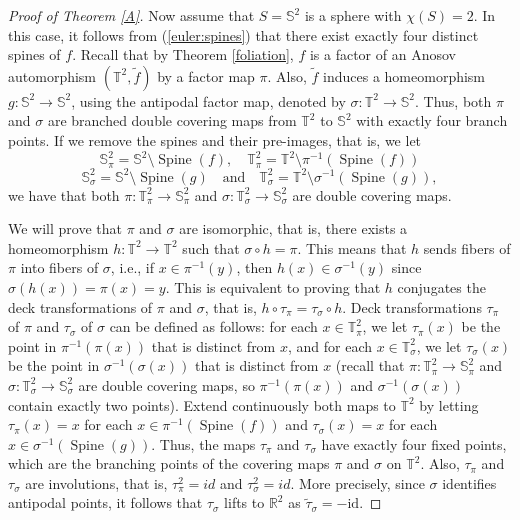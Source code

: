 \documentclass{amsart}
\theoremstyle{plain}
\theoremstyle{definition}
\newcommand{\spine}{\operatorname{Spine}}
\newcommand{\T}{\mathbb{T}}
\newcommand{\R}{\mathbb{R}}
\begin{document}
\begin{proof}[Proof of Theorem \ref{A}]
Now assume that $S=\mathbb{S}^2$ is a sphere with $\chi(S)=2$. In this case, it follows from (\ref{euler:spines}) that there exist exactly four distinct spines of $f$. Recall that by Theorem \ref{foliation}, $f$ is a factor of an Anosov automorphism $(\T^2,\tilde f)$ by a factor map $\pi$. Also, $\tilde f$ induces a homeomorphism $g\colon \mathbb{S}^2\to\mathbb{S}^2$, using the antipodal factor map, denoted by $\sigma\colon\mathbb{T}^2\to\mathbb{S}^2$. Thus, both $\pi$ and $\sigma$ are branched double covering maps from $\mathbb{T}^2$ to $\mathbb{S}^2$ with exactly four branch points. 
If we remove the spines and their pre-images, that is, we let $$\mathbb{S}^2_{\pi}=\mathbb{S}^2\setminus\spine(f), \,\,\,\,\,\, \mathbb{T}^{2}_{\pi}=\mathbb{T}^2\setminus\pi^{-1}(\spine(f))$$ 
$$\mathbb{S}^2_{\sigma}=\mathbb{S}^2\setminus\spine(g)\,\,\,\,\,\, \text{and} \,\,\,\,\,\, \mathbb{T}^{2}_{\sigma}=\mathbb{T}^2\setminus\sigma^{-1}(\spine(g)),$$ we have that both $\pi\colon\mathbb{T}^{2}_{\pi}\to\mathbb{S}^2_{\pi}$ and $\sigma\colon\mathbb{T}^{2}_{\sigma}\to\mathbb{S}^2_{\sigma}$ are double covering maps. 

We will prove that $\pi$ and $\sigma$ are isomorphic, that is, there exists a homeomorphism $h\colon\mathbb{T}^2\to \mathbb{T}^2$ such that $\sigma\circ h=\pi$. This means that $h$ sends fibers of $\pi$ into fibers of $\sigma$, i.e., if $x\in\pi^{-1}(y)$, then $h(x)\in\sigma^{-1}(y)$ since $\sigma(h(x))=\pi(x)=y$. This is equivalent to proving that $h$ conjugates the deck transformations of $\pi$ and $\sigma$, that is, $h\circ\tau_{\pi}=\tau_{\sigma}\circ h$.
Deck transformations $\tau_{\pi}$ of $\pi$ and $\tau_{\sigma}$ of $\sigma$ can be defined as follows: for each $x\in\mathbb{T}^2_{\pi}$, we let $\tau_{\pi}(x)$ be the point in $\pi^{-1}(\pi(x))$ that is distinct from $x$, and for each $x\in\mathbb{T}^2_{\sigma}$, we let $\tau_{\sigma}(x)$ be the point in $\sigma^{-1}(\sigma(x))$ that is distinct from $x$ (recall that $\pi\colon\mathbb{T}^{2}_{\pi}\to\mathbb{S}^2_{\pi}$ and $\sigma\colon\mathbb{T}^{2}_{\sigma}\to\mathbb{S}^2_{\sigma}$ are double covering maps, so $\pi^{-1}(\pi(x))$ and $\sigma^{-1}(\sigma(x))$ contain exactly two points). Extend continuously both maps to $\mathbb{T}^2$ by letting $\tau_{\pi}(x)=x$ for each $x\in\pi^{-1}(\spine(f))$ and $\tau_{\sigma}(x)=x$ for each $x\in\sigma^{-1}(\spine(g))$. Thus, the maps $\tau_{\pi}$ and $\tau_{\sigma}$ have exactly four fixed points, which are the branching points of the covering maps $\pi$ and $\sigma$ on $\T^2$. Also, $\tau_{\pi}$ and $\tau_{\sigma}$ 
are involutions, that is, $\tau_{\pi}^2=id$ and $\tau_{\sigma}^2=id$. More precisely, since $\sigma$ identifies antipodal points, it follows that $\tau_{\sigma}$ lifts to $\R^2$ as $\tilde\tau_{\sigma}=-\text{id}$. 


\end{proof}
\end{document}

